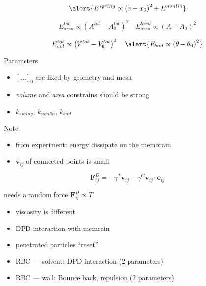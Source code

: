 \bframe{}
\bcc  
  \bc
  \ec
  \bc
  \ec
\ecc  
\eframe

\[
  \alert{E^{spring} \propto \left( x - x_0 \right)^2 + E^{nonlin}}
\]

\[
  E^{tot}_{area} \propto \left( A^{tot} - A_{0}^{tot} \right)^2 \quad
  E^{local}_{area} \propto \left( A - A_{0} \right)^2
\]

\[
         E^{tot}_{vol} \propto \left( V^{tot} - V_{0}^{tot} \right)^2 \quad
  \alert{E_{bnd} \propto \left(\theta - \theta_0 \right)^2}
\]

\begin{exampleblock}{Parameters}
  \begin{itemize}
  \item $[\ldots]_0$ are fixed by geometry and mesh
  \item \textit{volume} and \textit{area} constrains should be strong
  \item $k_{spring}$, $k_{nonlin}$, $k_{bnd}$
  \end{itemize}
\end{exampleblock}
\eframe

\begin{exampleblock}{Note}
  \begin{itemize}
    \item from experiment: energy dissipate on the membrain
    \item $\mathbf{v}_{ij}$ of connected points is small
  \end{itemize}
\end{exampleblock}
  
\[
\mathbf{F}_{ij}^D = - \gamma^T \mathbf{v}_{ij} - \gamma^C \mathbf{v}_{ij} \cdot \mathbf{e}_{ij}
\]

needs a random force $\mathbf{F}_{ij}^D \propto T$
\eframe

\begin{itemize}
  \item viscosity is different
  \item DPD interaction with memrain
  \item penetrated particles ``reset''
\end{itemize}
\eframe

  \begin{exampleblock}{}
    \begin{itemize}
    \item RBC --- solvent: DPD interaction (2 parameters)
    \item RBC --- wall: Bounce back, repulsion (2 parameters)
    \end{itemize}
  \end{exampleblock}
\eframe
